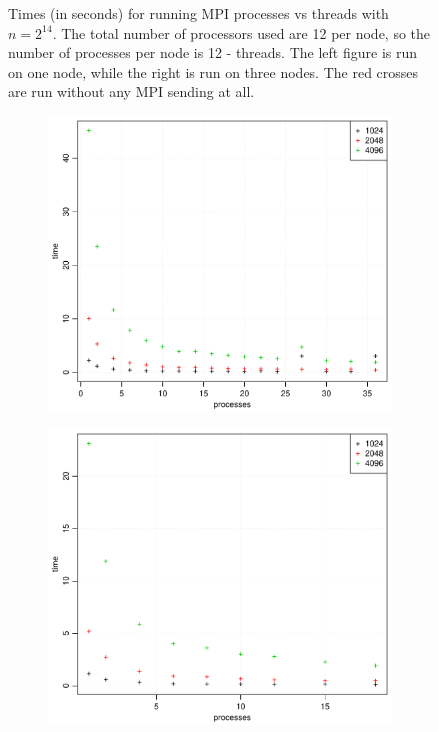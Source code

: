 \begin{figure}[h!]
\begin{subfigure}[b]{0.48\textwidth}
  \end{subfigure}
  \vspace{1\baselineskip}
  \caption{Times (in seconds) for running MPI processes vs threads with $n = 2^{14}$. The total number of processors used are 12 per node, so the number of processes per node is 12 - threads. The left figure is run on one node, while the right is run on three nodes. The red crosses are run without any MPI sending at all.}
  \label{fig:taskc}
\end{figure}
%
%
\begin{figure}[h!]
  \centering
  \begin{subfigure}[b]{0.48\textwidth}
    \includegraphics[width=\textwidth]{./Figures/taskbTimeProc1.pdf}
  \end{subfigure}%
  \quad
  \begin{subfigure}[b]{0.48\textwidth}
    \includegraphics[width=\textwidth]{./Figures/taskbTimeProc2.pdf}

\end{subfigure}
\end{figure}
